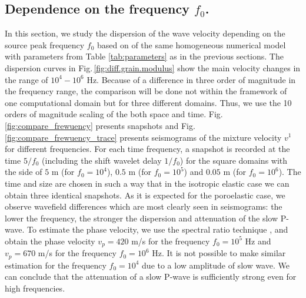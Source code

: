 \documentclass[3p,times,table]{article}
\begin{document}
\subsection{Dependence on the frequency $f_{0}$.}\label{sec.frequency}

In this section, we study the dispersion of the wave velocity depending on the 
source 
peak frequency $f_{0}$  based on of the same homogeneous numerical model 
with 
parameters from Table \ref{tab:parameters} as in the previous sections. 
The dispersion curves in Fig.\,\ref{fig:diff.grain.modulus} show the main 
velocity changes in the range of $10^{4}-10^{6}$ Hz. Because of a difference in 
three order of magnitude in the frequency range, the comparison will be done 
not 
within the framework of one computational domain but for three different 
domains. Thus, we use the 10 orders of magnitude scaling of the both space and 
time. Fig.\,\ref{fig:compare_frewuency} presents 
snapshots and Fig.\,\ref{fig:compare_frewuency_trace} presents seismograms of 
the mixture velocity $v^1$ for different frequencies. For each time frequency, 
a snapshot is recorded at the time $5/{f_{0}}$ (including the shift wavelet 
delay $1/{f_{0}}$) for the square domains with the side of $ 5 $ m (for 
$f_{0}=10^{4}$), $0.5$  m (for 
$f_{0}=10^{5}$) and $0.05$  m (for $f_{0}=10^{6}$). The time 
and size are chosen in such a way that in the isotropic elastic case 
we can obtain three identical snapshots. As it is expected for the poroelastic 
case, 
we 
observe wavefield differences which are most clearly seen in seismograms: the 
lower the frequency, the stronger the dispersion and attenuation of the slow 
P-wave. 
To estimate the phase velocity, we use 
the spectral ratio technique 
\cite{Gurevich2015}, \cite{Caspari2019}
and obtain the 
phase velocity $v_{p}=420 $ m/s for the frequency $f_{0}=10^{5}$ Hz and
$v_{p}=670 $ m/s  for the frequency $f_{0}=10^{6}$ Hz. 
It is not possible to make 
similar estimation for the frequency $f_{0}=10^{4}$ due to a low amplitude of slow wave. We 
can conclude that the attenuation of a slow P-wave is sufficiently strong even 
for high frequencies.
\end{document}
